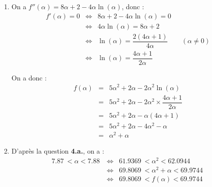\documentclass[10pt]{article}
\providecommand{\np}[2][]{{#2~#1}}
\begin{document}
\begin{enumerate}
\begin{enumerate}
		Sur $[\text{e}~;~+\infty[$, la fonction $f'$ est continue (puisque dérivable) et strictement décroissante. De plus, $f(_text{e}) = 4\text{e} + 2 > 0$ et $\lim\limits_{x \to +\infty}f'(x) = -\infty$. $0 \in ]-\infty~;~4\text{e}+2[$, donc, d'après le corollaire du théorème des valeurs intermédiaires, l'équation $f'(x) = 0$ admet une solution unique $\alpha$ sur $[\text{e}~;~+\infty[$.\\
		\smallskip
		
		Au final, l'équation $f'(x) = 0$ admet une solution unique $\alpha$ sur $]0~;~+\infty[$.\\
		\medskip
		
		On a :
		\[\boxed{\np{7.87} < \alpha < \np{7.88}}\]
		\item On sait que sur $]0~;~\text{e}]$ on a $f'(x) > 0$. Puisque $f'$ est décroissante sur $[\text{e}~;~+\infty[$ et qu'elle s'annule en $\alpha$, $f'(x) \geqslant 0$ sur $[\text{e}~;~\alpha]$ et $f'(x) \leqslant 0$ sur $[\alpha~;~+\infty[$. Donc $f'(x)$ est positif sur $]0~;~\alpha]$ et négatif sur $[\alpha~;~+\infty[$.
		
		\begin{center}
		\end{center}
	\end{enumerate}
	\item On a $f''(\alpha) = 8\alpha + 2 - 4\alpha \ln(\alpha)$, donc :
	\begin{eqnarray*}
		f'(\alpha) = 0 &\iff& 8\alpha + 2 - 4 \alpha \ln(\alpha) = 0\\
		&\iff& 4\alpha\ln(\alpha) = 8\alpha + 2\\
		&\iff& \ln(\alpha) = \dfrac{2(4\alpha+1)}{4\alpha} \qquad (\alpha \neq 0)\\
		&\iff& \boxed{\ln(\alpha) = \dfrac{4\alpha+1}{2\alpha}}
	\end{eqnarray*}
	
	On a donc :
	\begin{eqnarray*}
		f(\alpha) &=& 5\alpha^2 + 2\alpha - 2\alpha^2 \ln(\alpha) \\
		&=& 5\alpha^2 + 2\alpha - 2\alpha^2 \times \dfrac{4\alpha+1}{2\alpha} \\
		&=& 5\alpha^2 + 2\alpha - \alpha(4\alpha + 1) \\
		&=& 5\alpha^2 + 2\alpha - 4\alpha^2 - \alpha \\
		&=& \boxed{\alpha^2  + \alpha}
	\end{eqnarray*}
	\item D'après la question \textbf{4.a.}, on a :
	\begin{eqnarray*}
		\np{7.87} < \alpha < \np{7.88} &\iff& \np{61.9369} < \alpha^2 < \np{62.0944} \\
		&\iff& \np{69.8069} < \alpha^2 + \alpha < \np{69.9744} \\
		&\iff& \boxed{\np{69.8069} < f(\alpha) < \np{69.9744}}
	\end{eqnarray*}
\end{enumerate}
\end{document}
